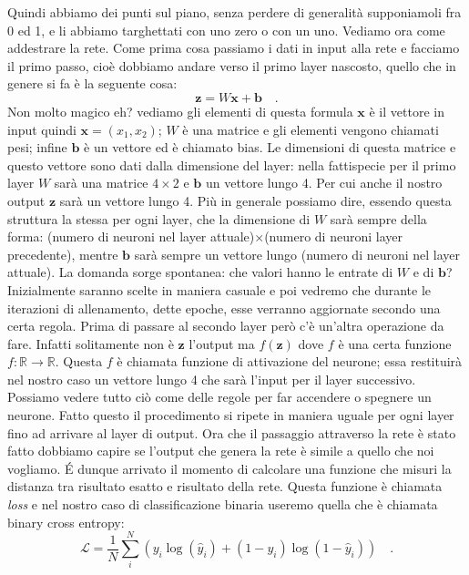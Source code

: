 \documentclass[10pt,a4paper]{article}
\begin{document}
\FloatBarrier
Quindi abbiamo dei punti sul piano, senza perdere di generalità supponiamoli fra 0 ed 1, e li abbiamo targhettati con uno zero o con un uno. Vediamo ora come addestrare la rete. Come prima cosa passiamo i dati in input alla rete e facciamo il primo passo, cioè dobbiamo andare verso il primo layer nascosto, quello che in genere si fa è la seguente cosa:
\begin{equation}
\textbf{z} = W \textbf{x} + \textbf{b} \quad.
\end{equation}
Non molto magico eh? vediamo gli elementi di questa formula $\textbf{x}$ è il vettore in input quindi $\textbf{x} = (x_1, x_2)$; $W$ è una matrice e gli elementi vengono chiamati pesi; infine $\textbf{b}$ è un vettore ed è chiamato bias. Le dimensioni di questa matrice e questo vettore sono dati dalla dimensione del layer: nella fattispecie per il primo layer $W$ sarà una matrice $4 \times 2$ e $\textbf{b}$ un vettore lungo 4. Per cui anche il nostro output $\textbf{z}$ sarà un vettore lungo 4. Più in generale possiamo dire, essendo questa struttura la stessa per ogni layer, che la dimensione di $W$ sarà sempre della forma: (numero di neuroni nel layer attuale)$\times$(numero di neuroni layer precedente), mentre $\textbf{b}$ sarà sempre un vettore lungo (numero di neuroni nel layer attuale). La domanda sorge spontanea: che valori hanno le entrate di $W$ e di $\textbf{b}$? Inizialmente saranno scelte in maniera casuale e poi vedremo che durante le iterazioni di allenamento, dette epoche, esse verranno aggiornate secondo una certa regola. Prima di passare al secondo layer però c'è un'altra operazione da fare. Infatti solitamente non è $\textbf{z}$ l'output ma $f(\textbf{z})$ dove $f$ è una certa funzione $f : \mathbb{R} \to \mathbb{R}$. Questa $f$ è chiamata funzione di attivazione del neurone; essa restituirà nel nostro caso un vettore lungo 4 che sarà l'input per il layer successivo. Possiamo vedere tutto ciò come delle regole per far accendere o spegnere un neurone. Fatto questo il procedimento si ripete in maniera uguale per ogni layer fino ad arrivare al layer di output. Ora che il passaggio attraverso la rete è stato fatto dobbiamo capire se l'output che genera la rete è simile a quello che noi vogliamo. \' E dunque arrivato il momento di calcolare una funzione che misuri la distanza tra risultato esatto e risultato della rete. Questa funzione è chiamata \textit{loss} e nel nostro caso di classificazione binaria useremo quella che è chiamata binary cross entropy:
\begin{equation}
\mathcal{L} = \frac{1}{N} \sum_i^N (y_i \log(\hat{y}_i) + (1 - y_i) \log(1 - \hat{y}_i)) \quad.
\end{equation}
\end{document}
